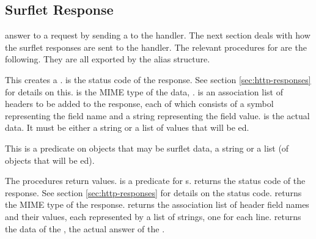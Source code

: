 \subsection{Surflet Response}

\surflets answer to a request by sending a  to
the \surflet handler.  The next section deals with how the surflet
responses are sent to the \surflet handler.  The relevant procedures
for  are the following.  They are all exported by
the  alias 
structure.

\begin{desc}
  This creates a .   is the status
  code of the response.  See section \ref{sec:http-responses} for
  details on this.   is the MIME type of the data,
  \eg {}.   is an association list of
  headers to be added to the response, each of which consists of a
  symbol representing the field name and a string representing the
  field value.   is the actual data.  It must be either a
  string or a list of values that will be ed.
\end{desc}

\begin{desc}
  This is a predicate on objects that may be surflet data, \ie a
  string or a list (of objects that will be ed).
\end{desc}

\begin{desc}
  The procedures return  values.
   is a predicate for s.
   returns the status code of the
  response.  See section \ref{sec:http-responses} for details on the
  status code.   returns the MIME
  type of the response.   returns the
  association list of header field names and their values, each
  represented by a list of strings, one for each line.
   returns the data of the
  , the actual answer of the \surflet.
\end{desc}

